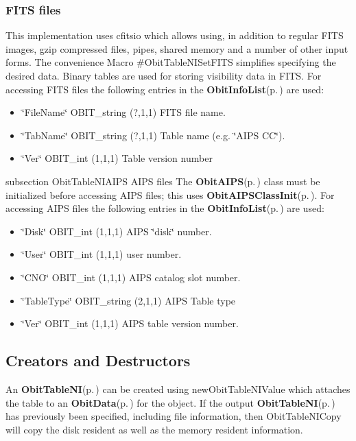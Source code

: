 \subsubsection{FITS files}\label{ObitTableWX_8h_TableFITS}
This implementation uses cfitsio which allows using, in addition to regular FITS images, gzip compressed files, pipes, shared memory and a number of other input forms. The convenience Macro \#Obit\-Table\-NISet\-FITS simplifies specifying the desired data. Binary tables are used for storing visibility data in FITS. For accessing FITS files the following entries in the {\bf Obit\-Info\-List}{\rm (p.\,\pageref{structObitInfoList})} are used: \begin{itemize}
\item \char`\"{}File\-Name\char`\"{} OBIT\_\-string (?,1,1) FITS file name. \item \char`\"{}Tab\-Name\char`\"{} OBIT\_\-string (?,1,1) Table name (e.g. \char`\"{}AIPS CC\char`\"{}). \item \char`\"{}Ver\char`\"{} OBIT\_\-int (1,1,1) Table version number\end{itemize}
subsection Obit\-Table\-NIAIPS AIPS files The {\bf Obit\-AIPS}{\rm (p.\,\pageref{structObitAIPS})} class must be initialized before accessing AIPS files; this uses {\bf Obit\-AIPSClass\-Init}{\rm (p.\,\pageref{ObitAIPS_8c_a5})}. For accessing AIPS files the following entries in the {\bf Obit\-Info\-List}{\rm (p.\,\pageref{structObitInfoList})} are used: \begin{itemize}
\item \char`\"{}Disk\char`\"{} OBIT\_\-int (1,1,1) AIPS \char`\"{}disk\char`\"{} number. \item \char`\"{}User\char`\"{} OBIT\_\-int (1,1,1) user number. \item \char`\"{}CNO\char`\"{} OBIT\_\-int (1,1,1) AIPS catalog slot number. \item \char`\"{}Table\-Type\char`\"{} OBIT\_\-string (2,1,1) AIPS Table type \item \char`\"{}Ver\char`\"{} OBIT\_\-int (1,1,1) AIPS table version number.\end{itemize}
\subsection{Creators and Destructors}\label{ObitTableNI_8h_ObitTableNIaccess}
An {\bf Obit\-Table\-NI}{\rm (p.\,\pageref{structObitTableNI})} can be created using new\-Obit\-Table\-NIValue which attaches the table to an {\bf Obit\-Data}{\rm (p.\,\pageref{structObitData})} for the object. If the output {\bf Obit\-Table\-NI}{\rm (p.\,\pageref{structObitTableNI})} has previously been specified, including file information, then Obit\-Table\-NICopy will copy the disk resident as well as the memory resident information.


